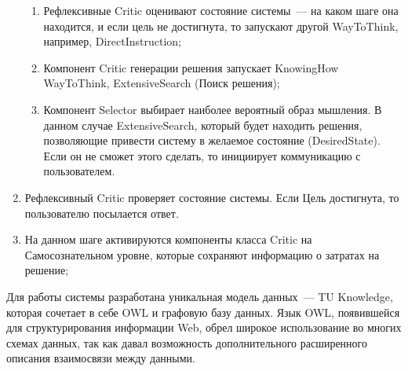 \begin{enumerate}
\begin{enumerate}
	\item Рефлексивные Critic оценивают состояние системы~--- на каком шаге она находится, и если цель не достигнута, то запускают другой WayToThink, например, DirectInstruction;
	\item Компонент Critic генерации решения запускает KnowingHow WayToThink, ExtensiveSearch (Поиск решения);
	\item Компонент Selector выбирает наиболее вероятный образ мышления. В данном случае ExtensiveSearch, который будет находить решения, позволяющие привести систему в желаемое состояние (DesiredState). Если он не сможет этого сделать, то инициирует коммуникацию с пользователем. 
 \end{enumerate}
	 \item Рефлексивный Critic проверяет состояние системы. Если Цель достигнута, то пользователю посылается ответ.
	 \item На данном шаге активируются компоненты класса Critic на Самосознательном уровне, которые сохраняют информацию о затратах на решение;
  \end{enumerate}\par
Для работы системы разработана уникальная модель данных~--- TU Knowledge, которая сочетает в себе OWL и графовую базу данных. Язык OWL, появившейся для структурирования информации Web, обрел широкое использование во многих схемах данных, так как давал возможность дополнительного расширенного описания взаимосвязи между данными. 

